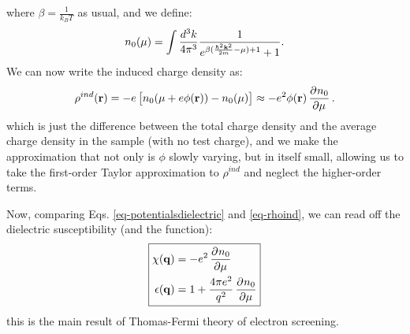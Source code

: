 where $\beta = \frac{1}{k_B T}$ as usual, and we define:
\begin{equation}
    n_0(\mu) = \int \frac{d^3k}{4\pi^3}\frac{1}{e^{\beta(\frac{\hbar^2\mathbf{k}^2}{2m} - \mu) + 1} + 1}.
\end{equation}
We can now write the induced charge density as:
\begin{equation}\label{eq-rhoind}
    \rho^{ind}(\v{r}) = -e\left[n_0(\mu + e\phi(\v{r})) - n_0(\mu)\right] \approx -e^2\phi(\v{r})\dpd{n_0}{\mu}.
\end{equation}
which is just the difference between the total charge density and the average charge density in the sample (with no test charge), and we make the approximation that not only is $\phi$ slowly varying, but in itself small, allowing us to take the first-order Taylor approximation to $\rho^{ind}$ and neglect the higher-order terms.

Now, comparing Eqs. \eqref{eq-potentialsdielectric} and \eqref{eq-rhoind}, we can read off the dielectric susceptibility (and the function):
\begin{equation}\label{eq-TFresult}
    \boxed{\begin{split}
        \chi(\v{q}) &= -e^2\dpd{n_0}{\mu}
    \\ \e(\v{q}) &= 1 + \frac{4\pi e^2}{q^2}\dpd{n_0}{\mu}
    \end{split}}
\end{equation}
this is the main result of Thomas-Fermi theory of electron screening.

